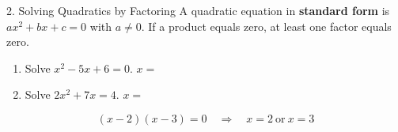\begin{notesbox}{2. Solving Quadratics by Factoring}
A quadratic equation in \textbf{standard form} is $ax^2+bx+c=0$ with $a\neq 0$.
If a product equals zero, at least one factor equals zero.
\begin{enumerate}
  \item Solve $x^2-5x+6=0$. \hfill $x=$ \blank{2.5cm}
  \item Solve $2x^2+7x=4$. \hfill $x=$ \blank{2.5cm}
\end{enumerate}
\[ (x-2)(x-3)=0 \quad\Longrightarrow\quad x=2 \ \text{or}\ x=3 \]
\end{notesbox}
